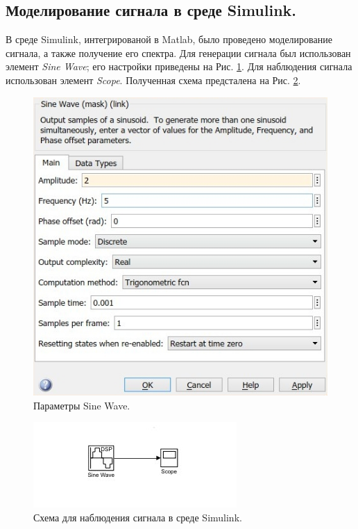 \documentclass[a4paper,14pt]{extarticle}
\begin{document}
\subsection{Моделирование сигнала в среде Simulink.}
В среде Simulink, интегрированой в Matlab, было проведено моделирование сигнала, а также получение его спектра. Для генерации сигнала был использован элемент \textit{Sine Wave}; его настройки приведены на Рис. \ref{sine_wave}. Для наблюдения сигнала использован элемент \textit{Scope}. Полученная схема предсталена на Рис. \ref{scheme}.
\begin{figure}[H]
\centering
\includegraphics[scale=0.5]{pics/simulink_params.jpg}
\caption{Параметры Sine Wave.}
\label{sine_wave}
\end{figure}
\begin{figure}[H]
\centering
\includegraphics[scale=1.2]{pics/simulink_scheme.jpg}
\caption{Схема для наблюдения сигнала в среде Simulink.}
\label{scheme}
\end{figure}
\end{document}
